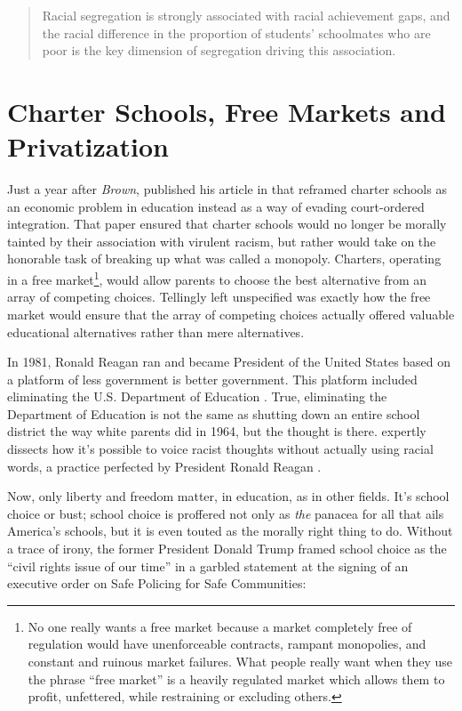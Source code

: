 \begin{quote}\OnehalfSpacing%
  Racial segregation is strongly associated with racial achievement gaps, and the racial difference in the proportion of students’ schoolmates who are poor is the key dimension of segregation driving this association. 
  \end{quote}

\section{Charter Schools, Free Markets  and Privatization}\label{sec:freemarkets}\indent

Just a year after \textit{Brown},  \textcite{Friedman1955} published his article  in  \parencite{Friedman1955} that reframed charter schools as an economic problem in education instead as a way of evading court-ordered integration. That paper ensured that charter schools would no longer be morally tainted by their association with virulent racism, but rather would take on the honorable task of breaking up what was called a monopoly. Charters, operating in a free market\footnote{No one really wants a free market because a  market completely free of regulation would have unenforceable contracts, rampant monopolies, and constant and ruinous market failures. What people really want when they use the phrase ``free market'' is a heavily regulated market which allows them to profit, unfettered, while restraining or excluding others.}, would allow parents to choose the best alternative from an array of competing choices. Tellingly left unspecified was exactly how the free market would ensure that the array of competing choices actually offered valuable educational alternatives rather than mere alternatives.

In 1981, Ronald Reagan ran and became President of the United States based on a platform of less government is better government. This platform included eliminating the U.S. Department of Education \parencite{gop1980}. True, eliminating the Department of Education is not the same as shutting down an entire school district the way white parents did in 1964, but the thought is there. \textcite{Haney-López2014} expertly dissects how it's possible to voice racist thoughts without actually using racial words, a practice perfected by President Ronald Reagan \parencite{Haney-López2014}.

Now, only liberty and freedom matter, in education, as in other fields. It's school choice or bust; school choice is proffered not only as \textit{the} panacea for all that ails America's schools, but it is even touted as the morally right thing to do. Without a  trace of irony, the former President Donald Trump framed school choice as the ``civil rights issue of our time'' in a garbled statement at the signing of an executive order on Safe Policing for Safe Communities:

